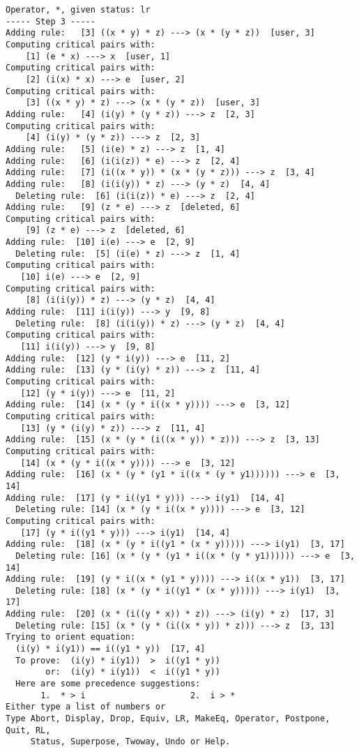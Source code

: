 \begin{verbatim}
Operator, *, given status: lr
----- Step 3 -----
Adding rule:   [3] ((x * y) * z) ---> (x * (y * z))  [user, 3]
Computing critical pairs with: 
    [1] (e * x) ---> x  [user, 1]
Computing critical pairs with: 
    [2] (i(x) * x) ---> e  [user, 2]
Computing critical pairs with: 
    [3] ((x * y) * z) ---> (x * (y * z))  [user, 3]
Adding rule:   [4] (i(y) * (y * z)) ---> z  [2, 3]
Computing critical pairs with: 
    [4] (i(y) * (y * z)) ---> z  [2, 3]
Adding rule:   [5] (i(e) * z) ---> z  [1, 4]
Adding rule:   [6] (i(i(z)) * e) ---> z  [2, 4]
Adding rule:   [7] (i((x * y)) * (x * (y * z))) ---> z  [3, 4]
Adding rule:   [8] (i(i(y)) * z) ---> (y * z)  [4, 4]
  Deleting rule:  [6] (i(i(z)) * e) ---> z  [2, 4]
Adding rule:   [9] (z * e) ---> z  [deleted, 6]
Computing critical pairs with: 
    [9] (z * e) ---> z  [deleted, 6]
Adding rule:  [10] i(e) ---> e  [2, 9]
  Deleting rule:  [5] (i(e) * z) ---> z  [1, 4]
Computing critical pairs with: 
   [10] i(e) ---> e  [2, 9]
Computing critical pairs with: 
    [8] (i(i(y)) * z) ---> (y * z)  [4, 4]
Adding rule:  [11] i(i(y)) ---> y  [9, 8]
  Deleting rule:  [8] (i(i(y)) * z) ---> (y * z)  [4, 4]
Computing critical pairs with: 
   [11] i(i(y)) ---> y  [9, 8]
Adding rule:  [12] (y * i(y)) ---> e  [11, 2]
Adding rule:  [13] (y * (i(y) * z)) ---> z  [11, 4]
Computing critical pairs with: 
   [12] (y * i(y)) ---> e  [11, 2]
Adding rule:  [14] (x * (y * i((x * y)))) ---> e  [3, 12]
Computing critical pairs with: 
   [13] (y * (i(y) * z)) ---> z  [11, 4]
Adding rule:  [15] (x * (y * (i((x * y)) * z))) ---> z  [3, 13]
Computing critical pairs with: 
   [14] (x * (y * i((x * y)))) ---> e  [3, 12]
Adding rule:  [16] (x * (y * (y1 * i((x * (y * y1)))))) ---> e  [3, 14]
Adding rule:  [17] (y * i((y1 * y))) ---> i(y1)  [14, 4]
  Deleting rule: [14] (x * (y * i((x * y)))) ---> e  [3, 12]
Computing critical pairs with: 
   [17] (y * i((y1 * y))) ---> i(y1)  [14, 4]
Adding rule:  [18] (x * (y * i((y1 * (x * y))))) ---> i(y1)  [3, 17]
  Deleting rule: [16] (x * (y * (y1 * i((x * (y * y1)))))) ---> e  [3, 14]
Adding rule:  [19] (y * i((x * (y1 * y)))) ---> i((x * y1))  [3, 17]
  Deleting rule: [18] (x * (y * i((y1 * (x * y))))) ---> i(y1)  [3, 17]
Adding rule:  [20] (x * (i((y * x)) * z)) ---> (i(y) * z)  [17, 3]
  Deleting rule: [15] (x * (y * (i((x * y)) * z))) ---> z  [3, 13]
Trying to orient equation: 
  (i(y) * i(y1)) == i((y1 * y))  [17, 4]
  To prove:  (i(y) * i(y1))  >  i((y1 * y))
        or:  (i(y) * i(y1))  <  i((y1 * y))
  Here are some precedence suggestions:
       1.  * > i                     2.  i > *
Either type a list of numbers or
Type Abort, Display, Drop, Equiv, LR, MakeEq, Operator, Postpone, Quit, RL,
     Status, Superpose, Twoway, Undo or Help.
\end{verbatim}
